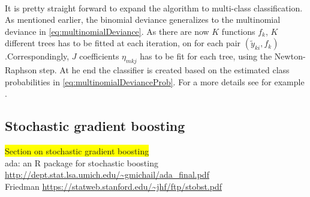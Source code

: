 \\
It is pretty straight forward to expand the algorithm to multi-class classification. As mentioned earlier, the binomial deviance generalizes to the multinomial deviance in \eqref{eq:multinomialDeviance}. As there are now $K$ functions $f_k$, $K$ different trees has to be fitted at each iteration, on for each pair $(\tilde y_{k i}, f_k)$.Correspondingly, $J$ coefficients $\eta_{m k j}$ has to be fit for each tree, using the Newton-Raphson step. At he end the classifier is created based on the estimated class probabilities in \eqref{eq:multinomialDevianceProb}. For a more details see for example \cite{friedman}.






\subsection{Stochastic gradient boosting}
\label{sub:Stochastic gradient boosting}

\colorbox{yellow}{Section on stochastic gradient boosting}\\
ada: an R package for stochastic boosting \url{http://dept.stat.lsa.umich.edu/~gmichail/ada_final.pdf} \\
Friedman \url{https://statweb.stanford.edu/~jhf/ftp/stobst.pdf} \\

